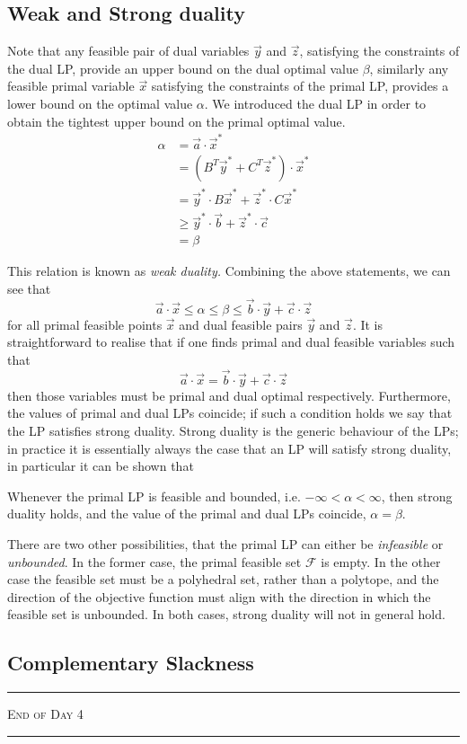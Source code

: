 \subsection{Weak and Strong duality}
Note that any feasible pair of dual variables $\vec{y}$ and $\vec{z}$, satisfying the constraints of the dual LP, provide an upper bound on the dual optimal value $\beta$, similarly any feasible primal variable $\vec{x}$ satisfying the constraints of the primal LP, provides a lower bound on the optimal value $\alpha$.
We introduced the dual LP in order to obtain the tightest upper bound on the primal optimal value.
\begin{align}
    \alpha & = \vec{a} \cdot \vec{x}^{*}                                      \\
           & = (B^{T}\vec{y}^{*} + C^{T}\vec{z}^{*})\cdot \vec{x}^{*}         \\
           & = \vec{y}^{*}\cdot B\vec{x}^{*} + \vec{z}^{*}\cdot C \vec{x}^{*} \\
           & \ge \vec{y}^{*}\cdot \vec{b} + \vec{z}^{*} \cdot \vec{c}         \\
           & = \beta
\end{align}

This relation is known as \textit{weak duality.} Combining the above statements, we can see that
$$\vec{a}\cdot \vec{x} \le \alpha \le \beta \le \vec{b}\cdot \vec{y} + \vec{c}\cdot \vec{z}$$
for all primal feasible points $\vec{x}$ and dual feasible pairs $\vec{y}$ and $\vec{z}$. It is straightforward to realise that if one finds primal and dual feasible variables such that
$$ \vec{a}\cdot \vec{x} = \vec{b} \cdot \vec{y} + \vec{c}\cdot \vec{z}$$
then those variables must be primal and dual optimal respectively. Furthermore, the values of primal and dual LPs coincide; if such a condition holds we say that the LP satisfies strong duality.
Strong duality is the generic behaviour of the LPs; in practice it is essentially always the case that an LP will satisfy strong duality, in particular it can be shown that

\begin{theo}
    Whenever the primal LP is feasible and bounded, i.e. $-\infty < \alpha < \infty$, then strong duality holds, and the value of the primal and dual LPs coincide, $\alpha = \beta$.
\end{theo}

There are two other possibilities, that the primal LP can either be \textit{infeasible} or \textit{unbounded}. In the former case, the primal feasible set $\mathcal{F}$ is empty. In the other case the feasible set must be a polyhedral set, rather than a polytope, and the direction of the objective function must align with the direction in which the feasible set is unbounded.
In both cases, strong duality will not in general hold.

\subsection{Complementary Slackness}

\begin{center}
    {\color{quantumdeep}
        \rule{\linewidth}{0.6pt}

        \scshape\Large End of Day 4

        \rule{\linewidth}{0.6pt}}
\end{center}
